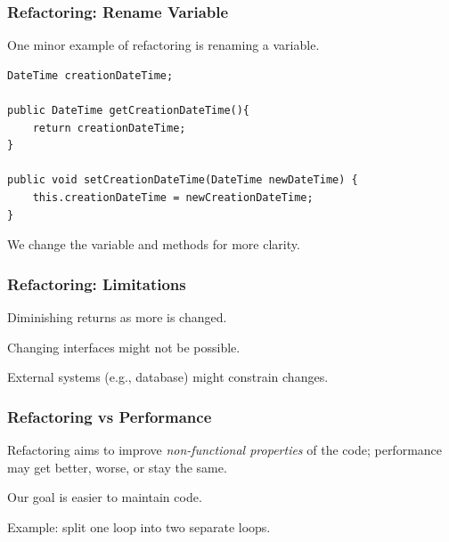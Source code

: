 \begin{frame}[fragile]
\frametitle{Refactoring: Rename Variable}
\begin{changemargin}{1cm}
One minor example of refactoring is renaming a variable.


\begin{verbatim}
DateTime creationDateTime;

public DateTime getCreationDateTime(){
    return creationDateTime;
}

public void setCreationDateTime(DateTime newDateTime) {
    this.creationDateTime = newCreationDateTime;
}

\end{verbatim}

We change the variable and methods for more clarity.

\end{changemargin}
\end{frame}


\begin{frame}
\frametitle{Refactoring: Limitations}
\begin{changemargin}{1cm}

Diminishing returns as more is changed.

Changing interfaces might not be possible.

External systems (e.g., database) might constrain changes.

\end{changemargin}
\end{frame}

\begin{frame}
\frametitle{Refactoring vs Performance}
\begin{changemargin}{1cm}

Refactoring aims to improve \emph{non-functional properties} of the code; performance may get better, worse, or stay the same.

Our goal is easier to maintain code.

Example: split one loop into two separate loops.

\end{changemargin}
\end{frame}

